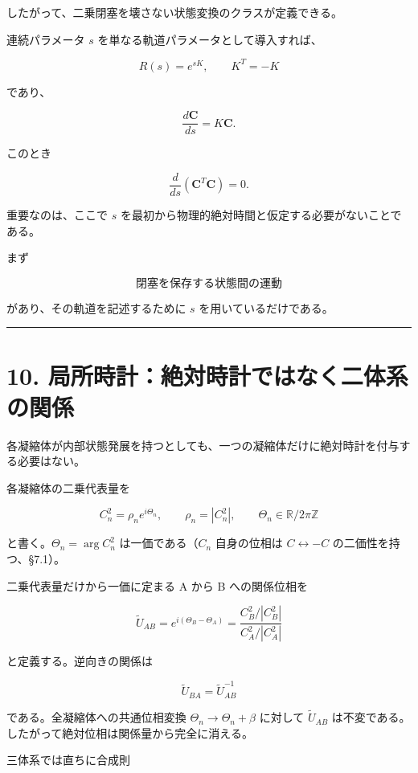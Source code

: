 \documentclass[
  a4paper,
]{ltjsarticle}
\begin{document}
したがって、二乗閉塞を壊さない状態変換のクラスが定義できる。

連続パラメータ \(s\) を単なる軌道パラメータとして導入すれば、

\[
R(s)=e^{sK},
\qquad K^T=-K
\]

であり、

\[
\frac{d\mathbf C}{ds}=K\mathbf C.
\]

このとき

\[
\frac{d}{ds}
\left(
\mathbf C^T\mathbf C
\right)
=
0.
\]

重要なのは、ここで \(s\)
を最初から物理的絶対時間と仮定する必要がないことである。

まず

\[
\boxed{
\text{閉塞を保存する状態間の運動}
}
\]

があり、その軌道を記述するために \(s\) を用いているだけである。

\begin{center}\rule{0.5\linewidth}{0.5pt}\end{center}

\section{10.
局所時計：絶対時計ではなく二体系の関係}\label{ux5c40ux6240ux6642ux8a08ux7d76ux5bfeux6642ux8a08ux3067ux306fux306aux304fux4e8cux4f53ux7cfbux306eux95a2ux4fc2}

各凝縮体が内部状態発展を持つとしても、一つの凝縮体だけに絶対時計を付与する必要はない。

各凝縮体の二乗代表量を

\[
C_n^2=\rho_n e^{i\Theta_n},
\qquad
\rho_n=|C_n^2|,
\qquad
\Theta_n\in\mathbb R/2\pi\mathbb Z
\]

と書く。\(\Theta_n=\arg C_n^2\) は一価である（\(C_n\) 自身の位相は
\(C\leftrightarrow-C\) の二価性を持つ、§7.1）。

二乗代表量だけから一価に定まる A から B への関係位相を

\[
\boxed{
\tilde U_{AB}
=
e^{i(\Theta_B-\Theta_A)}
=
\frac{C_B^2/|C_B^2|}{C_A^2/|C_A^2|}
}
\]

と定義する。逆向きの関係は

\[
\boxed{
\tilde U_{BA}=\tilde U_{AB}^{-1}
}
\]

である。全凝縮体への共通位相変換 \(\Theta_n\to\Theta_n+\beta\) に対して
\(\tilde U_{AB}\)
は不変である。したがって絶対位相は関係量から完全に消える。

三体系では直ちに合成則
\end{document}
